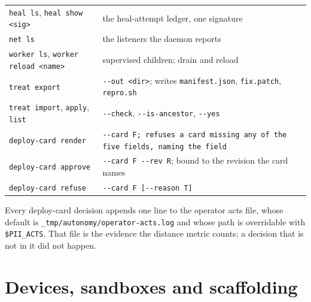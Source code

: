 \begin{center}
\begin{tabular}{@{}>{\raggedright\arraybackslash}p{}>{\raggedright\arraybackslash}p{}@{}}
  \texttt{heal ls}, \texttt{heal show <sig>} & the heal-attempt ledger, one signature \\
  \texttt{net ls} & the listeners the daemon reports \\
  \texttt{worker ls}, \texttt{worker reload <name>} & supervised children; drain and reload \\
  \texttt{treat export} & \texttt{-{}-out <dir>}; writes \texttt{manifest.json},
    \texttt{fix.patch}, \texttt{repro.sh} \\
  \texttt{treat import}, \texttt{apply}, \texttt{list} & \texttt{-{}-check},
    \texttt{-{}-is-ancestor}, \texttt{-{}-yes} \\
  \texttt{deploy-card render} & \texttt{-{}-card F; refuses a card missing any of the five
    fields, naming the field} \\
  \texttt{deploy-card approve} & \texttt{-{}-card F -{}-rev R}; bound to the revision the card
    names \\
  \texttt{deploy-card refuse} & \texttt{-{}-card F [-{}-reason T]} \\
  \bottomrule
\end{tabular}
\end{center}

Every deploy-card decision appends one line to the operator acts file, whose default is
\texttt{\_tmp/autonomy/operator-acts.log} and whose path is overridable with
\texttt{\$PII\_ACTS}. That file is the evidence the distance metric counts; a decision that is
not in it did not happen.

\section{Devices, sandboxes and scaffolding}

